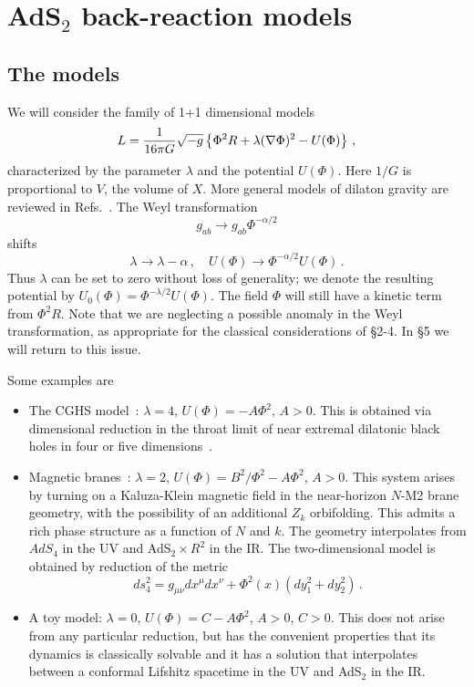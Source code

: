 \documentclass[12pt]{article}
\newcommand{\sect}[1]{\section{#1}\setcounter{equation}{0}}
\newcommand{\be}{\begin{equation}}
\newcommand{\ee}{\end{equation}}
\begin{document}
\sect{AdS$_2$ back-reaction models}



\subsection{The models}

We will consider the family of 1+1 dimensional models
\begin{equation}
L = {1 \over 16\pi G}  \sqrt{-g}\left\{ \Phi^2 R + \lambda (\nabla \Phi)^2 - U(\Phi)   \right\} \,, \label{L1}
\end{equation}
characterized by the parameter $\lambda$ and the potential $U(\Phi)$.   Here $1/G$ is proportional to $V$, the volume of $X$.  More general models of dilaton gravity are reviewed in Refs.~\cite{deAlwis:1992hv,Grumiller:2002nm}.  The Weyl transformation 
\be
g_{a b} \rightarrow g_{a b} \Phi^{-\alpha /2} \label{weyl}
\ee
shifts
\begin{equation}
\lambda \to \lambda - \alpha\,,\quad U(\Phi) \to \Phi^{-\alpha/2} U(\Phi) \,.
\end{equation}
Thus $\lambda$ can be set to zero without loss of generality; we denote the resulting potential by $ U_0(\Phi)= \Phi^{-\lambda/2} U(\Phi)$.  The field $\Phi$ will still have a kinetic term from $\Phi^2 R$.  Note that we are neglecting a possible anomaly in the Weyl transformation, as appropriate for the classical considerations of \S2-4.  In \S5 we will return to this issue.

Some examples are
\begin{itemize}
\item The CGHS model~\cite{Callan:1992rs}: $\lambda = 4$, $U(\Phi) = - A \Phi^2$, $A>0$.  This is obtained via dimensional reduction in the throat limit of near extremal dilatonic black holes in four or five dimensions~\cite{Giddings:1992kn}.
\item Magnetic branes~\cite{Hartnoll:2007ai,D'Hoker:2009mm,Almheiri:2011cb}: $\lambda = 2$, $U(\Phi) =  B^2/\Phi^2 - A \Phi^2$, $A>0$.  This system arises by turning on a Kaluza-Klein magnetic field in the near-horizon $N$-M2 brane geometry, with the possibility of an additional $Z_k$ orbifolding.   This admits a rich phase structure as a function of $N$ and $k$.   The geometry interpolates from $AdS_4$ in the UV and AdS$_2 \times R^2$ in the IR. 
The two-dimensional model is obtained by reduction of the metric
\begin{equation}
ds_4^2 = g_{\mu\nu}dx^\mu dx^\nu + \Phi^2(x)(dy_1^2 + dy_2^2) \,. \label{ansatz}
\end{equation}
\item A toy model: $\lambda = 0$, $U(\Phi) = C - A \Phi^2 $, $A>0$, $C>0$.  This does not arise from any particular reduction, but has the convenient properties that its dynamics is classically solvable and it has a solution that interpolates between a conformal Lifshitz spacetime in the UV and AdS$_2$ in the IR. 
\end{itemize}
\end{document}

